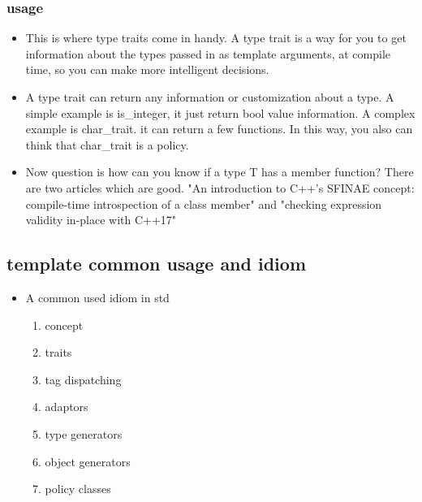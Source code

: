 \documentclass[a4paper,12pt,twoside]{book}
\begin{document}
\subsubsection{usage}
\begin{itemize}
	\item This is where type traits come in handy. A type trait is a way for you to get information about the types passed in as template arguments, at compile time, so you can make more intelligent decisions. 
	
	\item A type trait can return any information or customization about a type. A simple example is is\_integer, it just return bool value information. A complex example is char\_trait. it can return a few functions. In this way, you also can think that char\_trait is a policy. 
	


	\item Now question is how can you know if a type T has a member function? There are two articles which are good.
	"An introduction to C++'s SFINAE concept: compile-time introspection of a class member" and "checking expression validity in-place with C++17"

\end{itemize}

\subsection{template common usage and idiom}
\begin{itemize}
	
	\item A common used idiom in std
	\begin{enumerate}
		\item concept
		\item traits
		\item tag dispatching
		\item adaptors
		\item type generators
		\item object generators
		\item policy classes
	\end{enumerate}
\end{itemize}
\end{document}

